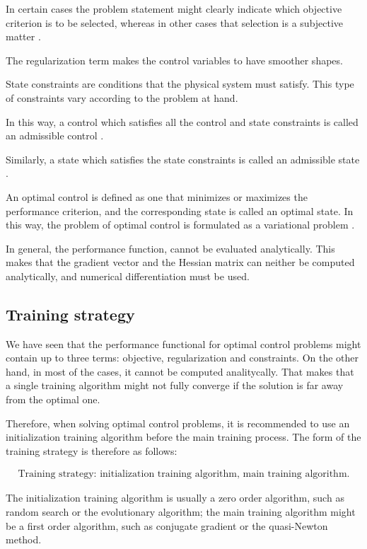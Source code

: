 In certain cases the problem statement might clearly indicate which
objective criterion is to be selected, whereas in other cases that
selection is a subjective matter \cite{Kirk1970}.

The regularization term makes the control variables to have smoother shapes. 

State constraints are conditions that the physical system must
satisfy. This type of constraints vary according to the problem at
hand.

In this way, a control which satisfies all the control and state
constraints is called an admissible control \cite{Kirk1970}.

Similarly, a state which satisfies the state constraints is called
an admissible state \cite{Kirk1970}.

An optimal control is defined as one that minimizes or maximizes the
performance criterion, and the corresponding state is called an
optimal state. In this way, the problem of optimal control is formulated as a
variational problem \cite{Kirk1970}.

In general, the performance function, cannot be evaluated analytically. 
This makes that the gradient vector and the Hessian matrix can neither be computed analytically, and numerical differentiation must be used. 

\subsection*{Training strategy}

We have seen that the performance functional for optimal control problems might contain up to three terms: 
objective, regularization and constraints. On the other hand, in most of the cases, it cannot be computed analitycally. 
That makes that a single training algorithm might not fully converge if the solution is far away from the optimal one. 

Therefore, when solving optimal control problems, it is recommended to use an initialization training algorithm before the main training process. 
The form of the training strategy is therefore as follows:

\begin{eqnarray}\nonumber
\text{Training strategy: initialization training algorithm, main training algorithm}. 
\end{eqnarray}

The initialization training algorithm is usually a zero order algorithm, such as random search or the evolutionary algorithm;
the main training algorithm might be a first order algorithm, such as conjugate gradient or the quasi-Newton method. 
